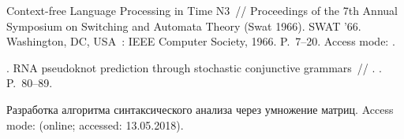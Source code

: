 \begin{thebibliography}{10}
 Context-free Language Processing in Time N3~//
  Proceedings of the 7th Annual Symposium on Switching and Automata Theory
  (Swat 1966). \BibDash
\newblock SWAT '66. \BibDash
\newblock Washington, DC, USA~: IEEE Computer Society, 1966. \BibDash
\newblock P.~7--20. \BibDash
\newblock Access mode: .

. RNA pseudoknot prediction
  through stochastic conjunctive grammars~// . \BibDash
{}. \BibDash
\newblock P.~80--89.

 Разработка алгоритма
  синтаксического анализа через умножение
  матриц. \BibDash
\newblock Access mode:
  (online; accessed: 13.05.2018).

\end{thebibliography}
